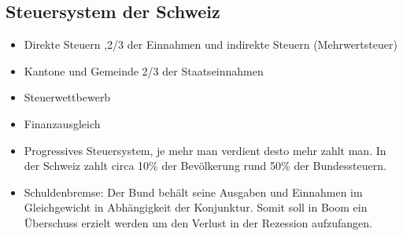 \subsection{Steuersystem der Schweiz}
\begin{itemize}
	\item Direkte Steuern ,2/3 der Einnahmen und indirekte Steuern (Mehrwertsteuer)
	\item Kantone und Gemeinde 2/3 der Staatseinnahmen
	\item Steuerwettbewerb
	\item Finanzausgleich
	\item Progressives Steuersystem, je mehr man verdient desto mehr zahlt man. In der Schweiz zahlt circa 10\% der Bevölkerung rund 50\% der Bundessteuern. 
	\item Schuldenbremse: Der Bund behält seine Ausgaben und Einnahmen im Gleichgewicht in Abhängigkeit der Konjunktur. Somit soll in Boom ein Überschuss erzielt werden um den Verlust in der Rezession aufzufangen. 
\end{itemize}